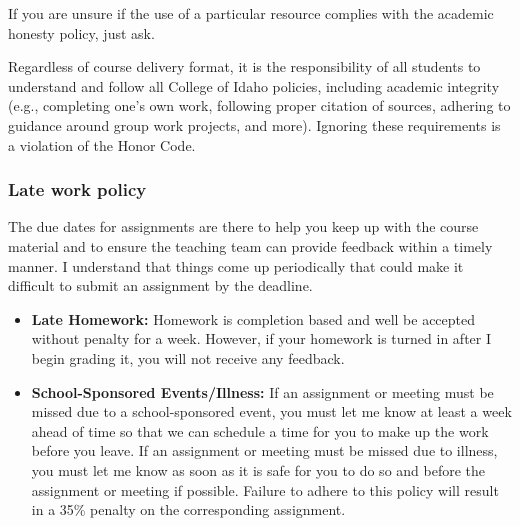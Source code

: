 \documentclass[
  letterpaper,
  DIV=11,
  numbers=noendperiod]{scrartcl}
\begin{document}
If you are unsure if the use of a particular resource complies with the
academic honesty policy, just ask.

Regardless of course delivery format, it is the responsibility of all
students to understand and follow all College of Idaho policies,
including academic integrity (e.g., completing one's own work, following
proper citation of sources, adhering to guidance around group work
projects, and more). Ignoring these requirements is a violation of the
Honor Code.

\subsubsection{Late work policy}\label{late-work-policy}

The due dates for assignments are there to help you keep up with the
course material and to ensure the teaching team can provide feedback
within a timely manner. I understand that things come up periodically
that could make it difficult to submit an assignment by the deadline.

\begin{itemize}
\item
  \textbf{Late Homework:} Homework is completion based and well be
  accepted without penalty for a week. However, if your homework is
  turned in after I begin grading it, you will not receive any feedback.
\item
  \textbf{School-Sponsored Events/Illness:} If an assignment or meeting
  must be missed due to a school-sponsored event, you must let me know
  at least a week ahead of time so that we can schedule a time for you
  to make up the work before you leave. If an assignment or meeting must
  be missed due to illness, you must let me know as soon as it is safe
  for you to do so and before the assignment or meeting if possible.
  Failure to adhere to this policy will result in a 35\% penalty on the
  corresponding assignment.
\end{itemize}
\end{document}
